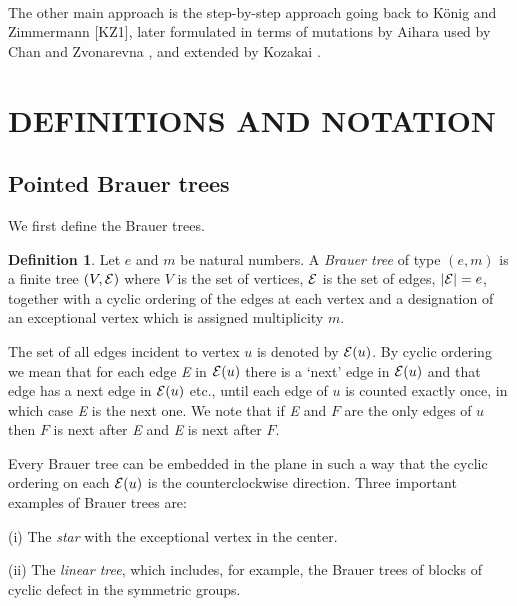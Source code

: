 \documentclass[11pt,english]{article}
\numberwithin{figure}{section}
\numberwithin{equation}{section}
\numberwithin{table}{section}
\theoremstyle{definition}
\newtheorem{defn}{Definition}[section]
\theoremstyle{remark}
\begin{document}
~

\noindent The other main approach is  the step-by-step approach
going back to König and Zimmermann {[}KZ1{]}, later formulated in terms
of mutations by Aihara \cite{Ai} used by Chan \cite{Ch}
and Zvonarevna \cite{Zv}, and extended by Kozakai \cite{K}.


\section{DEFINITIONS AND NOTATION}

\subsection{Pointed Brauer trees}

We first define  the Brauer
trees.

\noindent \begin{defn}
	
	\noindent Let $e$ and $m$ be natural numbers. A \textit{Brauer tree}
	of type\textit{ }$(e,m)$\textit{ }is a finite tree $(V,\ensuremath{{\cal E}})$
	where $V$ is the set of vertices, $\ensuremath{{\cal E}}$ is the
	set of edges, $|\ensuremath{{\cal E}|}=e$, together
	with a cyclic ordering of the edges at each vertex and a designation
	of an exceptional vertex which is assigned multiplicity $m$.
	
	\noindent \end{defn}

\noindent The set of all edges incident to vertex $u$ is denoted by $\ensuremath{{\cal E}}(u)$.
By \textquotedbl{}cyclic ordering\textquotedbl{} we mean that for
each edge \textit{E} in $\ensuremath{{\cal E}}(u)$ there is a `next'
edge in $\ensuremath{{\cal E}}(u)$ and that edge has a next edge
in $\ensuremath{{\cal E}(u)}$ etc., until each edge of $u$ is counted
exactly once, in which case\textit{ E} is the next one. We note that
if \textit{E} and $F$ are the only edges of $u$ then $F$ is next
after \textit{E} and \textit{E} is next after $F$.

\noindent \smallskip{}


\noindent Every Brauer tree can be embedded in the plane in such a
way that the cyclic ordering on each $\ensuremath{{\cal E}}(u)$ is
the counterclockwise direction.  Three important examples of Brauer trees are:

(i) The \textit{star} with the exceptional vertex in the center.

(ii) The \textit{linear tree}, which includes, for example, the Brauer trees of blocks of cyclic defect in the symmetric groups.
\end{document}
